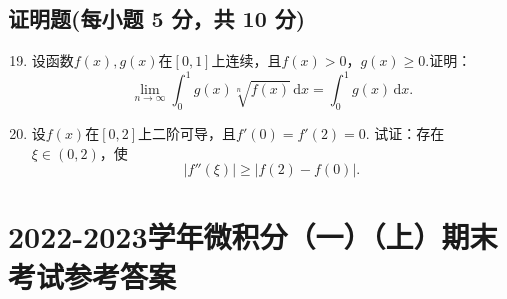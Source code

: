 \documentclass[../main.tex]{subfiles}
\begin{document}
\section{证明题(每小题 5 分，共 10 分)}
\begin{enumerate}
    \setcounter{enumi}{18}
    \item 设函数$f(x),g(x)$在$[0,1]$上连续，且$f(x)>0$，$g(x)\geq0$.证明：
          \[
              \lim_{n\to\infty}\int_{0}^{1}g(x)\sqrt[n]{f(x)}\,\mathrm{d}x=\int_{0}^{1}g(
              x)\,\mathrm{d}x.
          \]
          \vspace{9em}

    \item 设$f(x)$在$[0,2]$上二阶可导，且$f'(0)=f'(2)=0$. 试证：存在$\xi\in(
              0,2)$，使
          \[
              |f''(\xi)|\geq|f(2)-f(0)|.
          \]
          \vspace{9em}
\end{enumerate}

\chapter{2022-2023学年微积分（一）（上）期末考试参考答案}
\end{document}
